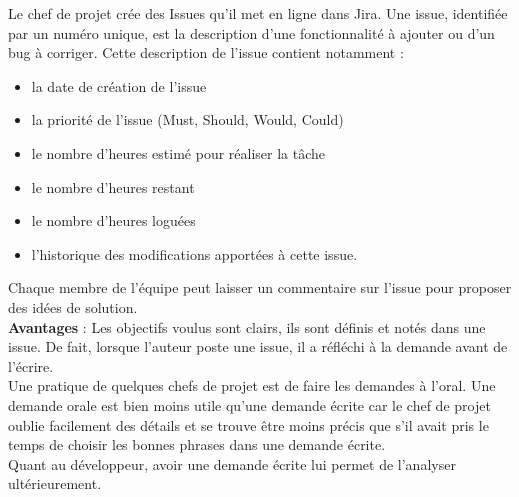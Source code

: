Le chef de projet crée des Issues qu'il met en ligne dans Jira.
Une issue, identifiée par un numéro unique, est la description d'une
fonctionnalité à ajouter ou d'un bug à corriger. 
Cette description de l'issue contient notamment :
\begin{itemize}
\item la date de création de l'issue
\item la priorité de l'issue (Must, Should, Would, Could)
\item le nombre d'heures estimé pour réaliser la tâche
\item le nombre d'heures restant
\item le nombre d'heures loguées
\item l'historique des modifications apportées à cette issue.\\

\end{itemize}

Chaque membre de l'équipe peut laisser un commentaire sur l'issue pour
proposer des idées de solution.\\

\textbf{Avantages} :
Les objectifs voulus sont clairs, ils sont définis et notés dans une issue.
De fait, lorsque l'auteur poste une issue, il a réfléchi à la demande avant de
l'écrire. \\
Une pratique de quelques chefs de projet est de faire les demandes à l'oral.
Une demande orale est bien moins utile qu'une demande écrite car le chef de
projet oublie facilement des détails et se trouve être moins précis que s'il
avait pris le temps de choisir les bonnes phrases dans une demande écrite.\\
Quant au développeur, avoir une demande écrite lui permet de l'analyser
ultérieurement.


